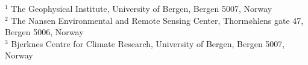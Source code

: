 $^1$ The Geophysical Institute, University of Bergen, Bergen 5007, Norway\\
$^2$ The Nansen Environmental and Remote Sensing Center, Thorm{\o}hlens gate 47, Bergen 5006, Norway\\
$^3$ Bjerknes Centre for Climate Research, University of Bergen, Bergen 5007, Norway\\